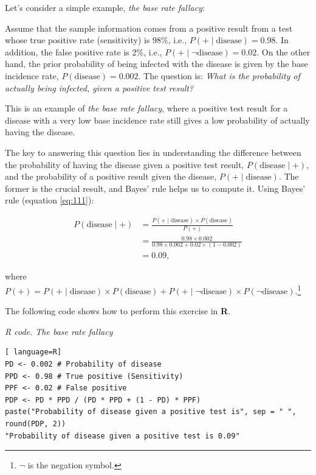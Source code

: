 Let's consider a simple example, \textit{the base rate fallacy}:

Assume that the sample information comes from a positive result from a test whose true positive rate (sensitivity) is 98\%, i.e., \( P(+ \mid \text{disease}) = 0.98 \). In addition, the false positive rate is 2\%, i.e., \( P(+ \mid \lnot\text{disease}) = 0.02 \). On the other hand, the prior probability of being infected with the disease is given by the base incidence rate, \( P(\text{disease}) = 0.002 \). The question is: \textit{What is the probability of actually being infected, given a positive test result?}

This is an example of \textit{the base rate fallacy}, where a positive test result for a disease with a very low base incidence rate still gives a low probability of actually having the disease.

The key to answering this question lies in understanding the difference between the probability of having the disease given a positive test result, \( P(\text{disease} \mid +) \), and the probability of a positive result given the disease, \( P(+ \mid \text{disease}) \). The former is the crucial result, and Bayes' rule helps us to compute it. Using Bayes' rule (equation \ref{eq:111}):

\begin{align*}
	P(\text{disease}\mid +) & = \frac{P(+\mid \text{disease})\times P(\text{disease})}{P(+)}\\
	& = \frac{0.98 \times 0.002}{0.98 \times 0.002 + 0.02 \times (1-0.002)}\\
	& =0.09, 
\end{align*}

where $P(+)=P(+\mid \text{disease})\times P(\text{disease})+P(+\mid \lnot\text{disease})\times P( \lnot\text{disease})$.\footnote{$\lnot$ is the negation symbol.}

The following code shows how to perform this exercise in \textbf{R}.

\begin{tcolorbox}[enhanced,width=4.67in,center upper,
	fontupper=\large\bfseries,drop shadow southwest,sharp corners]
\textit{R code. The base rate fallacy}
\begin{VF}
\begin{lstlisting}[ language=R]
PD <- 0.002 # Probability of disease
PPD <- 0.98 # True positive (Sensitivity)
PPF <- 0.02 # False positive
PDP <- PD * PPD / (PD * PPD + (1 - PD) * PPF)
paste("Probability of disease given a positive test is", sep = " ", round(PDP, 2))
"Probability of disease given a positive test is 0.09"
\end{lstlisting}
\end{VF}
\end{tcolorbox}

